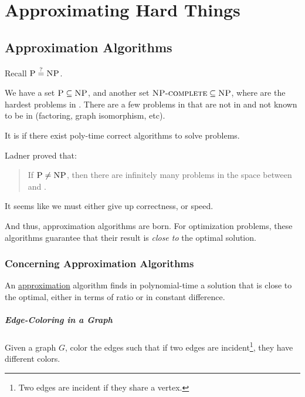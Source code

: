     \part{Approximating Hard Things} %
    \label{prt:approximating_ _hard_ _things_}
        \chapter{Approximation Algorithms} %
        \label{cha:approximation_algorithms}
            Recall $\textsc{P} \stackrel{?}{=} \textsc{NP}$.

            We have a set $\textsc{P} \subseteq \textsc{NP}$, and another set $\textsc{NP-complete} \subseteq \textsc{NP}$, where \npcomplete are the hardest problems in \np.
            There are a few problems in \np that are not in \p and not known to be in \npcomplete (factoring, graph isomorphism, etc).

            It is \open  if there exist poly-time correct algorithms to solve \npcomplete problems.

            Ladner proved that:
            \begin{quotation}
                If $\textsc{P} \not = \textsc{NP}$, then there are infinitely many problems in the space between \p and \npcomplete.
            \end{quotation}

            It seems like we must either give up correctness, or speed.

            And thus, approximation algorithms are born.
            For optimization problems, these algorithms guarantee that their result is \textit{close to} the optimal solution.

            \section{Concerning Approximation Algorithms} %
            \label{sec:concerning_approximation_algorithms}
                An \uline{approximation} algorithm finds in polynomial-time a solution that is close to the optimal, either in terms of ratio or in constant difference.

                \subsubsection{Edge-Coloring in a Graph} %
                \label{ssub:edge_coloring_in_a_graph}
                    Given a graph $G$, color the edges such that if two edges are incident\footnote{Two edges are incident if they share a vertex.}, they have different colors.

